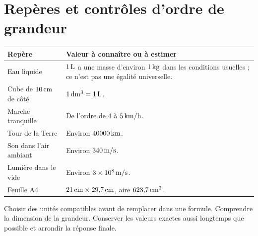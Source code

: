 \documentclass[../cours_3e.tex]{subfiles}
\begin{document}
\section{Repères et contrôles d'ordre de grandeur}
\begin{center}
\begin{tabularx}{\textwidth}{lX}
\toprule Repère & Valeur à connaître ou à estimer\\\midrule
Eau liquide & $1\,\mathrm{L}$ a une masse d'environ $1\,\mathrm{kg}$ dans les conditions usuelles ; ce n'est pas une égalité universelle.\\
Cube de $10\,\mathrm{cm}$ de côté & $1\,\mathrm{dm^3}=1\,\mathrm{L}$.\\
Marche tranquille & De l'ordre de $4$ à $5\,\mathrm{km/h}$.\\
Tour de la Terre & Environ $40000\,\mathrm{km}$.\\
Son dans l'air ambiant & Environ $340\,\mathrm{m/s}$.\\
Lumière dans le vide & Environ $3\times10^8\,\mathrm{m/s}$.\\
Feuille A4 & $21\,\mathrm{cm}\times29{,}7\,\mathrm{cm}$, aire $623{,}7\,\mathrm{cm^2}$.\\\bottomrule
\end{tabularx}
\end{center}
\begin{retenir}
Choisir des unités compatibles avant de remplacer dans une formule. Comprendre la dimension de la grandeur. Conserver les valeurs exactes aussi longtemps que possible et arrondir la réponse finale.
\end{retenir}
\end{document}
